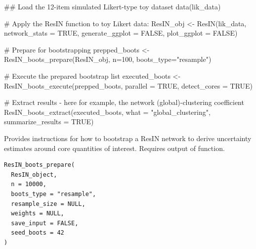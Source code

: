 \documentclass[a4paper]{book}
\begin{document}
\begin{Examples}
\begin{ExampleCode}
## Load the 12-item simulated Likert-type toy dataset
data(lik_data)

# Apply the ResIN function to toy Likert data:
ResIN_obj <- ResIN(lik_data, network_stats = TRUE,
                      generate_ggplot = FALSE, plot_ggplot = FALSE)


# Prepare for bootstrapping
prepped_boots <- ResIN_boots_prepare(ResIN_obj, n=100, boots_type="resample")

# Execute the prepared bootstrap list
executed_boots <-  ResIN_boots_execute(prepped_boots, parallel = TRUE, detect_cores = TRUE)

# Extract results - here for example, the network (global)-clustering coefficient
ResIN_boots_extract(executed_boots, what = "global_clustering", summarize_results = TRUE)



\end{ExampleCode}
\end{Examples}
%
\begin{Description}
Provides instructions for how to bootstrap a ResIN network to derive uncertainty estimates around core quantities of interest. Requires output of  function.
\end{Description}
%
\begin{Usage}
\begin{verbatim}
ResIN_boots_prepare(
  ResIN_object,
  n = 10000,
  boots_type = "resample",
  resample_size = NULL,
  weights = NULL,
  save_input = FALSE,
  seed_boots = 42
)
\end{verbatim}
\end{Usage}
%
\end{document}
